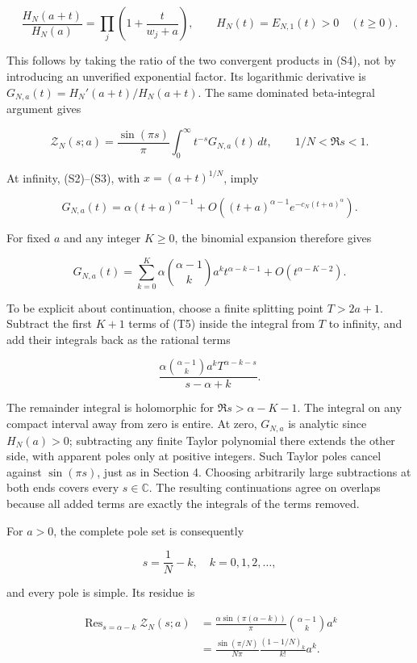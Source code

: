\[
\frac{H_N(a+t)}{H_N(a)}
=\prod_j\left(1+\frac{t}{w_j+a}\right),\qquad
H_N(t)=E_{N,1}(t)>0\quad(t\ge0).
\tag{T2}
\]

This follows by taking the ratio of the two convergent products in (S4),
not by introducing an unverified exponential factor. Its logarithmic
derivative is \(G_{N,a}(t)=H_N'(a+t)/H_N(a+t)\). The same dominated
beta-integral argument gives

\[
\mathcal Z_N(s;a)=\frac{\sin(\pi s)}{\pi}
\int_0^\infty t^{-s}G_{N,a}(t)\,dt,
\qquad 1/N<\Re s<1.
\tag{T3}
\]

At infinity, (S2)--(S3), with \(x=(a+t)^{1/N}\), imply

\[
G_{N,a}(t)=\alpha(t+a)^{\alpha-1}
+O\!\left((t+a)^{\alpha-1}e^{-c_N(t+a)^\alpha}\right).
\tag{T4}
\]

For fixed \(a\) and any integer \(K\ge0\), the binomial expansion
therefore gives

\[
G_{N,a}(t)=\sum_{k=0}^{K}\alpha\binom{\alpha-1}{k}a^k t^{\alpha-k-1}
+O(t^{\alpha-K-2}).
\tag{T5}
\]

To be explicit about continuation, choose a finite splitting point
\(T>2a+1\). Subtract the first \(K+1\) terms of (T5) inside the integral
from \(T\) to infinity, and add their integrals back as the rational
terms

\[
\frac{\alpha\binom{\alpha-1}{k}a^k
 T^{\alpha-k-s}}{s-\alpha+k}.
\tag{T6}
\]

The remainder integral is holomorphic for \(\Re s>\alpha-K-1\). The
integral on any compact interval away from zero is entire. At zero,
\(G_{N,a}\) is analytic since \(H_N(a)>0\); subtracting any finite
Taylor polynomial there extends the other side, with apparent poles only
at positive integers. Such Taylor poles cancel against \(\sin(\pi s)\),
just as in Section 4. Choosing arbitrarily large subtractions at both
ends covers every \(s\in\mathbb C\). The resulting continuations agree
on overlaps because all added terms are exactly the integrals of the
terms removed.

For \(a>0\), the complete pole set is consequently

\[
\boxed{s=\frac1N-k,\quad k=0,1,2,\ldots,}
\]

and every pole is simple. Its residue is

\[
\begin{aligned}
\operatorname{Res}_{s=\alpha-k}\mathcal Z_N(s;a)
&=\frac{\alpha\sin(\pi(\alpha-k))}{\pi}
  \binom{\alpha-1}{k}a^k\\
&=\boxed{\frac{\sin(\pi/N)}{N\pi}
          \frac{(1-1/N)_k}{k!}a^k.}
\end{aligned}
\tag{T7}
\]

